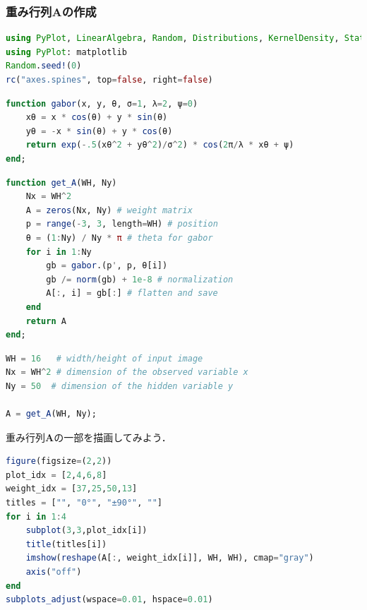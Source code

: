 \subsubsection{重み行列$\mathbf{A}$の作成}
\begin{lstlisting}[language=julia]
using PyPlot, LinearAlgebra, Random, Distributions, KernelDensity, StatsBase
using PyPlot: matplotlib
Random.seed!(0)
rc("axes.spines", top=false, right=false)
\end{lstlisting}
\begin{lstlisting}[language=julia]
function gabor(x, y, θ, σ=1, λ=2, ψ=0)
    xθ = x * cos(θ) + y * sin(θ)
    yθ = -x * sin(θ) + y * cos(θ)
    return exp(-.5(xθ^2 + yθ^2)/σ^2) * cos(2π/λ * xθ + ψ)
end;
\end{lstlisting}
\begin{lstlisting}[language=julia]
function get_A(WH, Ny)
    Nx = WH^2
    A = zeros(Nx, Ny) # weight matrix
    p = range(-3, 3, length=WH) # position
    θ = (1:Ny) / Ny * π # theta for gabor
    for i in 1:Ny
        gb = gabor.(p', p, θ[i])
        gb /= norm(gb) + 1e-8 # normalization
        A[:, i] = gb[:] # flatten and save
    end
    return A
end;
\end{lstlisting}
\begin{lstlisting}[language=julia]
WH = 16   # width/height of input image
Nx = WH^2 # dimension of the observed variable x
Ny = 50  # dimension of the hidden variable y

A = get_A(WH, Ny);
\end{lstlisting}
重み行列$\mathbf{A}$の一部を描画してみよう．
\begin{lstlisting}[language=julia]
figure(figsize=(2,2))
plot_idx = [2,4,6,8]
weight_idx = [37,25,50,13]
titles = ["", "0°", "±90°", ""]
for i in 1:4
    subplot(3,3,plot_idx[i])
    title(titles[i])
    imshow(reshape(A[:, weight_idx[i]], WH, WH), cmap="gray")
    axis("off")
end
subplots_adjust(wspace=0.01, hspace=0.01)
\end{lstlisting}
